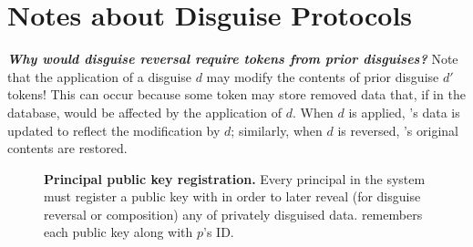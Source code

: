 \section{Notes about Disguise Protocols}
\textbf{\emph{Why would disguise reversal require tokens from prior disguises?}} 
Note that the application of a disguise $d$ may modify the contents of prior disguise $d'$ tokens!
This can occur because some token \tdata{} may store removed data that, if in the database, would be
affected by the application of $d$. When $d$ is applied, \tdata{}'s data is updated to reflect the
modification by $d$; similarly, when $d$ is reversed, \tdata{}'s original contents are restored.

\begin{figure*}[h!]
\caption{
\textbf{Principal public key registration.}
Every principal in the system must register a public key with \sys in order to later reveal (for
disguise reversal or composition) any of privately disguised data. \sys remembers each public
    key  along with $p$'s ID.}
\label{fig:acctreg}
\end{figure*}

